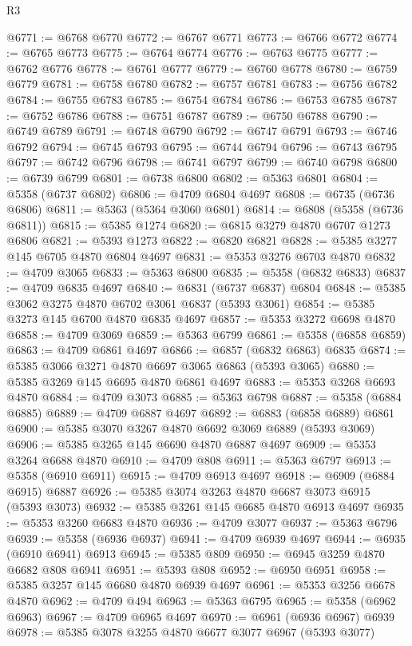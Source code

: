 \begin{lexlean}{R3}
\begin{coremodule}
@6771 := @6768 @6770
@6772 := @6767 @6771
@6773 := @6766 @6772
@6774 := @6765 @6773
@6775 := @6764 @6774
@6776 := @6763 @6775
@6777 := @6762 @6776
@6778 := @6761 @6777
@6779 := @6760 @6778
@6780 := @6759 @6779
@6781 := @6758 @6780
@6782 := @6757 @6781
@6783 := @6756 @6782
@6784 := @6755 @6783
@6785 := @6754 @6784
@6786 := @6753 @6785
@6787 := @6752 @6786
@6788 := @6751 @6787
@6789 := @6750 @6788
@6790 := @6749 @6789
@6791 := @6748 @6790
@6792 := @6747 @6791
@6793 := @6746 @6792
@6794 := @6745 @6793
@6795 := @6744 @6794
@6796 := @6743 @6795
@6797 := @6742 @6796
@6798 := @6741 @6797
@6799 := @6740 @6798
@6800 := @6739 @6799
@6801 := @6738 @6800
@6802 := @5363 @6801
@6804 := @5358 (@6737 @6802)
@6806 := @4709 @6804 @4697
@6808 := @6735 (@6736 @6806)
@6811 := @5363 (@5364 @3060 @6801)
@6814 := @6808 (@5358 (@6736 @6811))
@6815 := @5385 @1274
@6820 := @6815 @3279 @4870 @6707 @1273 @6806
@6821 := @5393 @1273
@6822 := @6820 @6821
@6828 := @5385 @3277 @145 @6705 @4870 @6804 @4697
@6831 := @5353 @3276 @6703 @4870
@6832 := @4709 @3065
@6833 := @5363 @6800
@6835 := @5358 (@6832 @6833)
@6837 := @4709 @6835 @4697
@6840 := @6831 (@6737 @6837) @6804
@6848 := @5385 @3062 @3275 @4870 @6702 @3061 @6837 (@5393 @3061)
@6854 := @5385 @3273 @145 @6700 @4870 @6835 @4697
@6857 := @5353 @3272 @6698 @4870
@6858 := @4709 @3069
@6859 := @5363 @6799
@6861 := @5358 (@6858 @6859)
@6863 := @4709 @6861 @4697
@6866 := @6857 (@6832 @6863) @6835
@6874 := @5385 @3066 @3271 @4870 @6697 @3065 @6863 (@5393 @3065)
@6880 := @5385 @3269 @145 @6695 @4870 @6861 @4697
@6883 := @5353 @3268 @6693 @4870
@6884 := @4709 @3073
@6885 := @5363 @6798
@6887 := @5358 (@6884 @6885)
@6889 := @4709 @6887 @4697
@6892 := @6883 (@6858 @6889) @6861
@6900 := @5385 @3070 @3267 @4870 @6692 @3069 @6889 (@5393 @3069)
@6906 := @5385 @3265 @145 @6690 @4870 @6887 @4697
@6909 := @5353 @3264 @6688 @4870
@6910 := @4709 @808
@6911 := @5363 @6797
@6913 := @5358 (@6910 @6911)
@6915 := @4709 @6913 @4697
@6918 := @6909 (@6884 @6915) @6887
@6926 := @5385 @3074 @3263 @4870 @6687 @3073 @6915 (@5393 @3073)
@6932 := @5385 @3261 @145 @6685 @4870 @6913 @4697
@6935 := @5353 @3260 @6683 @4870
@6936 := @4709 @3077
@6937 := @5363 @6796
@6939 := @5358 (@6936 @6937)
@6941 := @4709 @6939 @4697
@6944 := @6935 (@6910 @6941) @6913
@6945 := @5385 @809
@6950 := @6945 @3259 @4870 @6682 @808 @6941
@6951 := @5393 @808
@6952 := @6950 @6951
@6958 := @5385 @3257 @145 @6680 @4870 @6939 @4697
@6961 := @5353 @3256 @6678 @4870
@6962 := @4709 @494
@6963 := @5363 @6795
@6965 := @5358 (@6962 @6963)
@6967 := @4709 @6965 @4697
@6970 := @6961 (@6936 @6967) @6939
@6978 := @5385 @3078 @3255 @4870 @6677 @3077 @6967 (@5393 @3077)

\end{coremodule}
\end{lexlean}
